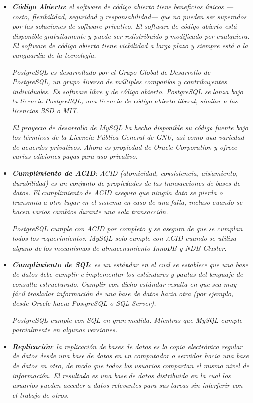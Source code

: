 \documentclass[11pt,oneside]{book}
\begin{document}
\begin{itemize}
\item \textit{\textbf{Código Abierto}}: \textit{el software de código abierto tiene beneficios únicos —costo, flexibilidad, seguridad y responsabilidad— que no pueden ser superados por las soluciones de software privativo. El software de código abierto está disponible gratuitamente y puede ser redistribuido y modificado por cualquiera. El software de código abierto tiene viabilidad a largo plazo y siempre está a la vanguardia de la tecnología.}

\textit{PostgreSQL es desarrollado por el Grupo Global de Desarrollo de PostgreSQL, un grupo diverso de múltiples compañías y contribuyentes individuales. Es software libre y de código abierto. PostgreSQL se lanza bajo la licencia PostgreSQL, una licencia de código abierto liberal, similar a las licencias BSD o MIT.}

\textit{El proyecto de desarrollo de MySQL ha hecho disponible su código fuente bajo los términos de la Licencia Pública General de GNU, así como una variedad de acuerdos privativos. Ahora es propiedad de Oracle Corporation y ofrece varias ediciones pagas para uso privativo.}

\item \textit{\textbf{Cumplimiento de ACID}}: \textit{ACID (atomicidad, consistencia, aislamiento, durabilidad) es un conjunto de propiedades de las transacciones de bases de datos. El cumplimiento de ACID asegura que ningún dato se pierda o transmita a otro lugar en el sistema en caso de una falla, incluso cuando se hacen varios cambios durante una sola transacción.}

\textit{PostgreSQL cumple con ACID por completo y se asegura de que se cumplan todos los requerimientos. MySQL solo cumple con ACID cuando se utiliza alguno de los mecanismos de almacenamiento InnoDB y NDB Cluster.}

\item \textit{\textbf{Cumplimiento de SQL}}: \textit{es un estándar en el cual se establece que una base de datos debe cumplir e implementar los estándares y pautas del lenguaje de consulta estructurado. Cumplir con dicho estándar resulta en que sea muy fácil trasladar información de una base de datos hacia otra (por ejemplo, desde Oracle hacia PostgreSQL o SQL Server).}

\textit{PostgreSQL cumple con SQL en gran medida. Mientras que MySQL cumple parcialmente en algunas versiones.}

\item \textit{\textbf{Replicación}}: \textit{la replicación de bases de datos es la copia electrónica regular de datos desde una base de datos en un computador o servidor hacia una base de datos en otro, de modo que todos los usuarios compartan el mismo nivel de información. El resultado es una base de datos distribuida en la cual los usuarios pueden acceder a datos relevantes para sus tareas sin interferir con el trabajo de otros.}


\end{itemize}
\end{document}
